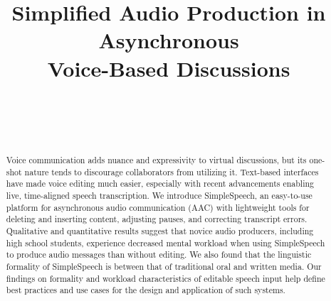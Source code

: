 \documentclass{sigchi}
\begin{document}
\title{Simplified Audio Production in Asynchronous \\ Voice-Based Discussions}

\author{%
  \\
  \\
  \\
}

\maketitle

\begin{abstract}
Voice communication adds nuance and expressivity to virtual discussions, but its one-shot nature tends to discourage collaborators from utilizing it.
Text-based interfaces have made voice editing much easier, especially with recent advancements enabling live, time-aligned speech transcription.
We introduce SimpleSpeech, an easy-to-use platform for asynchronous audio communication (AAC) with lightweight tools for deleting and inserting content, adjusting pauses, and correcting transcript errors.
Qualitative and quantitative results suggest that novice audio producers, including high school students, experience decreased mental workload when using SimpleSpeech to produce audio messages than without editing.
We also found that the linguistic formality of SimpleSpeech is between that of traditional oral and written media.
Our findings on formality and workload characteristics of editable speech input help define best practices and use cases for the design and application of such systems.
\end{abstract}


\end{document}
